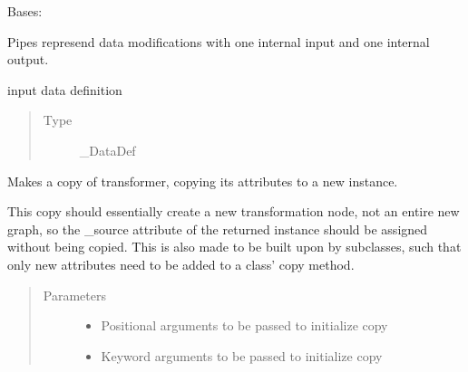 \documentclass[letterpaper,10pt,english]{sphinxmanual}
\begin{document}
\begin{fulllineitems}
\label{\detokenize{dalio.pipe:dalio.pipe.pipe.Pipe}}
Bases: 

Pipes represend data modifications with one internal input and one
internal output.

\begin{fulllineitems}
\label{\detokenize{dalio.pipe:dalio.pipe.pipe.Pipe._source}}
input data definition
\begin{quote}\begin{description}
\item[{Type}] \leavevmode
\_DataDef

\end{description}\end{quote}

\end{fulllineitems}


\begin{fulllineitems}
\label{\detokenize{dalio.pipe:dalio.pipe.pipe.Pipe.copy}}
Makes a copy of transformer, copying its attributes to a new
instance.

This copy should essentially create a new transformation node, not an
entire new graph, so the \_source attribute of the returned instance
should be assigned without being copied. This is also made to be built
upon by subclasses, such that only new attributes need to be added to
a class’ copy method.
\begin{quote}\begin{description}
\item[{Parameters}] \leavevmode\begin{itemize}
\item {} 
 \textendash{} Positional arguments to be passed to initialize copy

\item {} 
 \textendash{} Keyword arguments to be passed to initialize copy


\end{itemize}
\end{description}
\end{quote}
\end{fulllineitems}
\end{fulllineitems}
\end{document}
